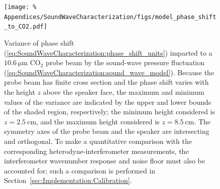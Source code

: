 \begin{figure}
  \centering
  \texttt{[image: \%
    Appendices/SoundWaveCharacterization/figs/model\_phase\_shift\_to\_CO2.pdf]}
  \caption[Variance of phase shift imparted to a CO$_2$ probe beam]{%
    Variance of phase shift
    (\ref{eq:SoundWaveCharacterization:phase_shift_units})
    imparted to a $\SI{10.6}{\micro\meter}$ CO$_2$ probe beam
    by the sound-wave pressure fluctuation
    (\ref{eq:SoundWaveCharacterization:sound_wave_model}).
    Because the probe beam has finite cross section and
    the phase shift varies with the height $z$ above the speaker face,
    the maximum and minimum values of the variance
    are indicated by the upper and lower bounds of the shaded region,
    respectively;
    the minimum height considered is $z = \SI{2.5}{\centi\meter}$, and
    the maximum height considered is $z = \SI{8.5}{\centi\meter}$.
    The symmetry axes of the probe beam and the speaker
    are intersecting and orthogonal.
    To make a quantitative comparison
    with the corresponding heterodyne-interferometer measurements,
    the interferometer wavenumber response and noise floor
    must also be accounted for;
    such a comparison is performed in
    Section~\ref{sec:Implementation:Calibration}.
  }
\label{fig:SoundWaveCharacterization:phase_shift}
\end{figure}




